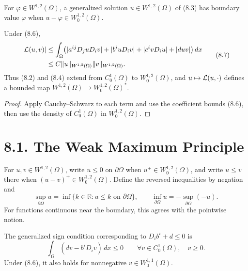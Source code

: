 \begin{definition}
\label{gt-def-8-generalized-dirichlet-problem}
For $\varphi\in W^{1,2}(\Omega)$, a generalized solution $u\in W^{1,2}(\Omega)$
of (8.3) has boundary value $\varphi$ when
$u-\varphi\in W_0^{1,2}(\Omega)$.
\end{definition}

\begin{proposition}
\label{gt-prop-8-bounded-weak-form}
Under (8.6),
\begin{equation}
\begin{split}
|\mathcal{L}(u,v)|
&\leq\int_\Omega\bigl(|a^{ij}D_juD_iv|+|b^iuD_iv|
 +|c^ivD_iu|+|duv|\bigr)\,dx\\
&\leq C\|u\|_{W^{1,2}(\Omega)}\|v\|_{W^{1,2}(\Omega)}.
\end{split}
\tag{8.7}
\end{equation}
Thus (8.2) and (8.4) extend from $C_0^1(\Omega)$ to
$W_0^{1,2}(\Omega)$, and $u\mapsto\mathcal{L}(u,\cdot)$ defines a bounded map
$W^{1,2}(\Omega)\to W_0^{1,2}(\Omega)^*$.
\end{proposition}
\begin{proof}
\sketch Apply Cauchy--Schwarz to each term and use the coefficient bounds (8.6),
then use the density of $C_0^1(\Omega)$ in $W_0^{1,2}(\Omega)$.
\end{proof}

\section*{8.1. The Weak Maximum Principle}

\begin{definition}
\label{gt-def-8-sobolev-boundary-inequalities}
For $u,v\in W^{1,2}(\Omega)$, write $u\leq0$ on $\partial\Omega$ when
$u^+\in W_0^{1,2}(\Omega)$, and write $u\leq v$ there when
$(u-v)^+\in W_0^{1,2}(\Omega)$. Define the reversed inequalities by negation and
\[
\sup_{\partial\Omega}u=
\inf\{k\in\mathbb R:u\leq k\text{ on }\partial\Omega\},
\qquad
\inf_{\partial\Omega}u=-\sup_{\partial\Omega}(-u).
\]
For functions continuous near the boundary, this agrees with the pointwise notion.
\end{definition}

\begin{convention}
\label{gt-conv-8-weak-zeroth-order-sign}
The generalized sign condition corresponding to $D_ib^i+d\leq0$ is
\begin{equation}
\int_\Omega(dv-b^iD_iv)\,dx\leq0
\qquad\forall v\in C_0^1(\Omega),\quad v\geq0.
\tag{8.8}
\end{equation}
Under (8.6), it also holds for nonnegative $v\in W_0^{1,1}(\Omega)$.
\end{convention}


